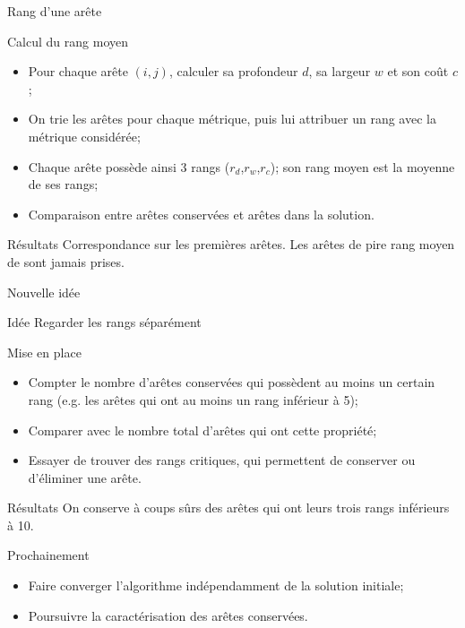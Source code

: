 \documentclass{beamer}
\begin{document}
\begin{frame}{Rang d'une arête}
\begin{block}{Calcul du rang moyen}
\begin{itemize}
\item Pour chaque arête $(i,j)$, calculer sa profondeur $d$, sa largeur $w$ et son coût $c$;
\item On trie les arêtes pour chaque métrique, puis lui attribuer un rang avec la métrique considérée;
\item Chaque arête possède ainsi $3$ rangs ($r_d$,$r_w$,$r_c$); son rang moyen est la moyenne de ses rangs;
\item Comparaison entre arêtes conservées et arêtes dans la solution.
\end{itemize}
\end{block}

\begin{exampleblock}{Résultats}
Correspondance sur les premières arêtes. Les arêtes de pire rang moyen de sont jamais prises.
\end{exampleblock}
\end{frame}

\begin{frame}{Nouvelle idée}
\begin{alertblock}{Idée}
Regarder les rangs séparément
\end{alertblock}

\begin{block}{Mise en place}
\begin{itemize}
\item Compter le nombre d'arêtes conservées qui possèdent au moins un certain rang (e.g. les arêtes qui ont au moins un rang inférieur à 5);
\item Comparer avec le nombre total d'arêtes qui ont cette propriété;
\item Essayer de trouver des rangs critiques, qui permettent de conserver ou d'éliminer une arête.
\end{itemize}
\end{block}

\begin{exampleblock}{Résultats}
On conserve à coups sûrs des arêtes qui ont leurs trois rangs inférieurs à 10.
\end{exampleblock}

\end{frame}

\begin{frame}{Prochainement}

\begin{itemize}
\item Faire converger l'algorithme indépendamment de la solution initiale;
\item Poursuivre la caractérisation des arêtes conservées.
\end{itemize}

\end{frame}
\end{document}
